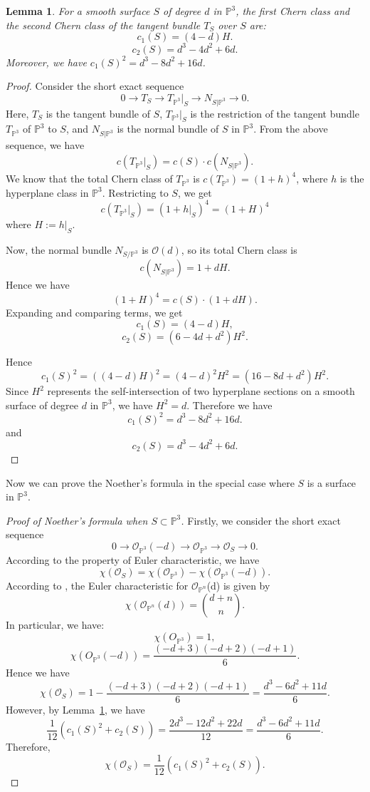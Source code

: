 \documentclass{article}
\newtheorem{lemma}[theorem]{Lemma}
\theoremstyle{definition}
\begin{document}
\begin{lemma}\label{LmmChernClassesOfSurfaceInP3}
For a smooth surface \( S \) of degree \( d \) in \(\mathbb{P}^3\),
the first Chern class and the second Chern class of the tangent bundle $T_S$ over $S$ are:
\[ c_1(S) = (4-d)H. \]
\[ c_2(S) = d^3 - 4d^2 + 6d. \]
Moreover, we have $c_1(S)^2 = d^3 - 8d^2 + 16d$.
\end{lemma}
\begin{proof} 
Consider the short exact sequence
\[ 
0 \to T_S \to T_{\mathbb{P}^3}|_S \to N_{S|\mathbb{P}^3} \to 0. 
\]
Here, \(T_S\) is the tangent bundle of \( S \), \( T_{\mathbb{P}^3}|_S \) is the restriction of the tangent bundle $T_{\mathbb{P}^3}$ of \(\mathbb{P}^3\) to \( S \), and \( N_{S|\mathbb{P}^3} \) is the normal bundle of \( S \) in \(\mathbb{P}^3\). From the above sequence, we have 
$$c(T_{\mathbb{P}^3}|_S) = c(S) \cdot c(N_{S|\mathbb{P}^3}).$$ 
We know that the total Chern class of \( T_{\mathbb{P}^3} \) is $c(T_{\mathbb{P}^3}) = (1 + h)^4$,
where \( h \) is the hyperplane class in \(\mathbb{P}^3\). Restricting to \( S \), we get 
$$c(T_{\mathbb{P}^3}|_S) = (1 + h|_S)^4=(1+H)^4$$ 
where $H:= h|_S $.  

Now, the normal bundle \( N_{S/\mathbb{P}^3} \) is \(\mathcal{O}(d) \), so its total Chern class is
\[ c(N_{S|\mathbb{P}^3}) = 1 + dH. \]
Hence we have 
\[ (1 + H)^4 = c(S) \cdot (1 + dH). \]
Expanding and comparing terms, we get
\[
c_1(S) = (4 - d)H, 
\]
\[
c_2(S)  = (6 - 4d + d^2)H^2. 
\]

Hence  \[ 
c_1(S)^2 = ((4 - d)H)^2 = (4 - d)^2H^2 = (16 - 8d + d^2)H^2.
\]
Since \( H^2 \) represents the self-intersection of two hyperplane sections on a smooth surface of degree \( d \) in \(\mathbb{P}^3\), we have \( H^2 = d \). Therefore we have
$$ 
c_1(S)^2 =d^3 - 8d^2 + 16d.
$$
and
$$c_2(S) = d^3 - 4d^2 + 6d. $$
\end{proof}
Now we can prove the Noether's formula in the special case where $S$ is a surface in $\mathbb P^3$.
\begin{proof}[Proof of Noether's formula when $S\subset \mathbb P^3$]
Firstly, we consider the short exact sequence
$$0 \to \mathcal{O}_{\mathbb{P}^3}(-d) \to \mathcal{O}_{\mathbb{P}^3}\to \mathcal{O}_S \to 0.$$
According to the property of Euler characteristic, we have
$$\chi (\mathcal{O}_S) = \chi(\mathcal{O}_{\mathbb{P}^3}) - \chi(\mathcal{O}_{\mathbb{P}^3}(-d)).$$ 
According to \cite[Theorem II.5.1]{Hartshorne}, the  Euler characteristic for $\mathcal{O}_{\mathbb{P}^n}$(d) is given by
$$\chi (\mathcal{O}_{\mathbb{P}^n}(d) )= \binom{d+n}{n}.$$
In particular, we have:
$$\chi(O_{\mathbb{P}^3}) = 1,$$
$$\chi(O_{\mathbb{P}^3}(-d)) = \frac{(-d+3)(-d+2)(-d+1)}{6}.$$
Hence we have
$$\chi (\mathcal{O}_S) = 1 -  \frac{(-d+3)(-d+2)(-d+1)}{6}  = \frac{d^3 - 6d^2 + 11d}{6}.$$
However, by Lemma~\ref{LmmChernClassesOfSurfaceInP3}, we have
$$\frac{1}{12}(c_1(S)^2+c_2(S)) = \frac{2d^3 - 12d^2 + 22d}{12} = \frac{d^3 - 6d^2 + 11d}{6}. $$
Therefore, $$\chi (\mathcal{O}_S) = \frac{1}{12}(c_1(S)^2+c_2(S)) .$$
\end{proof}
\end{document}
